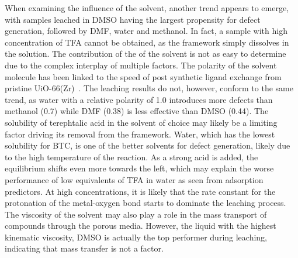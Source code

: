 When examining the influence of the solvent, another trend appears
to emerge, with samples leached in DMSO having the largest propensity
for defect generation, followed by DMF, water and methanol. In fact,
a sample with high concentration of TFA cannot be obtained, as the 
framework simply dissolves in the solution.
The contribution of the of the solvent is not as easy to determine due
to the complex interplay of multiple factors.
The polarity of the solvent molecule has been linked to 
the speed of post synthetic ligand exchange from
pristine UiO-66(Zr)~\cite{kimPostsyntheticLigandExchange2012}. The leaching
results do not, however, conform to the same trend, as water with a 
relative polarity of 1.0 introduces more defects than methanol 
(0.7) while DMF (0.38) is less effective than 
DMSO (0.44). The solubility of terephtalic acid in the solvent 
of choice may likely be a limiting factor driving its removal
from the framework. Water, which has the lowest solubility for 
BTC, is one of the better solvents for defect generation, likely
due to the high temperature of the reaction. As a strong acid
is added, the equilibrium shifts even more towards the 
left, which may explain the worse performance of low equivalents of TFA
in water as seen from adsorption predictors. At high concentrations,
it is likely that the rate constant for the protonation of the 
metal-oxygen bond starts to dominate the leaching process.
The viscosity of the 
solvent may also play a role in the mass transport of compounds 
through the porous media. However, the liquid with the highest 
kinematic viscosity, DMSO is actually the top performer during leaching,
indicating that mass transfer is not a factor.


